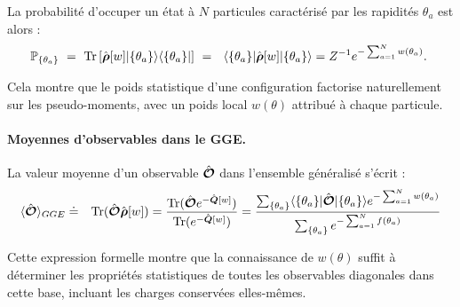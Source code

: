 La probabilité d’occuper un état à $N$ particules caractérisé par les rapidités ${\theta_a}$ est alors :
\begin{eqnarray}
	\mathbb{P}_{\{ \theta_a \}} ~=~ \mathrm{Tr} \left [\operator{\rho}[w] \vert \{ \theta_a \} \rangle \langle \{ \theta_a \} \vert  \right ] ~= ~ \langle \{ \theta_a \}\vert \operator{\rho}[w] \vert  \{ \theta_a \} \rangle = Z^{-1}e^{-\sum_{a = 1}^N w(\theta_a)}. 		
\end{eqnarray}

Cela montre que le poids statistique d’une configuration factorise naturellement sur les pseudo-moments, avec un poids local $w(\theta)$ attribué à chaque particule.



\paragraph{Moyennes d'observables dans le GGE.}
La valeur moyenne d’un observable $\hat{\bm{\mathcal{O}}}$ dans l’ensemble généralisé s’écrit :
\begin{eqnarray}
	\langle \hat{\bm{\mathcal{O}}} \rangle_{GGE} & \doteq & \displaystyle  \text{Tr} (\hat{\bm{\mathcal{O}}}\hat{\bm{\rho}}[w]) = \frac{\text{Tr} (\hat{\bm{\mathcal{O}}}e^{-\hat{\bm{Q}}[w]})}{\text{Tr} (e^{-\hat{\bm{Q}}[w]})}	 = \frac{\sum_{\{\theta_a \}} \langle  \{ \theta_a\}  \vert   \hat{\bm{\mathcal{O}}} \vert \{ \theta_a\} \rangle e^{- \sum_{a = 1}^N w(\theta_a) }  }{\sum_{\{\theta_a  \}} e^{- \sum_{a = 1}^N  f(\theta_a) } }
\end{eqnarray}

Cette expression formelle montre que la connaissance de $w(\theta)$ suffit à déterminer les propriétés statistiques de toutes les observables diagonales dans cette base, incluant les charges conservées elles-mêmes.
	
